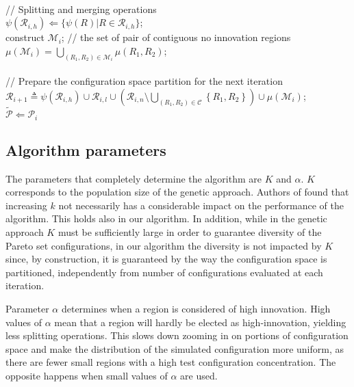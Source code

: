 \begin{algorithm}[t]
{			\nl \\ // Splitting and merging operations\\
			\nl $\psi(\mathscr{R}_{i,h}) \Leftarrow \lbrace 
					\psi(R) | R\in \mathscr{R}_{i,h}	
				\rbrace$; \\
			\nl construct $\mathscr{M}_i$; // the set of pair of contiguous no innovation regions \\
			\nl $\mu(\mathscr{M}_i) = \bigcup_{(R_1,R_2)\in\mathscr{M}_i} \mu(R_1,R_2)$;\\
			\nl\\ // Prepare the configuration space partition for the next iteration \\
			\nl $\mathcal{R}_{i+1} \triangleq
	\psi\left(\mathscr{R}_{i,h}\right) \cup \mathcal{R}_{i,l}\cup
	\left(\mathcal{R}_{i,n}\setminus\bigcup_{\left(R_{1},R_{2}\right)\in\mathcal{C}}\left\{ R_{1},R_{2}\right\} \right)\cup \mu(\mathscr{M}_i)$;\\
		}
	\nl $\tilde{\mathscr{P}} \Leftarrow \mathscr{P}_i$
\end{algorithm}
%

\subsection{Algorithm parameters}
The parameters that completely determine the algorithm are $K$ and $\alpha$.
$K$ corresponds to the population size of the genetic approach. Authors of \cite{zitzler_ec00} found that increasing $k$ not necessarily has a considerable impact on the performance of the algorithm. This holds also in our algorithm.  In addition, while in the genetic approach $K$ must be sufficiently large in order to guarantee diversity of the Pareto set configurations, in our algorithm the diversity is not impacted by $K$ since, by construction, it is guaranteed by the way the configuration space is partitioned, independently from number of configurations evaluated at each iteration. 

Parameter $\alpha$ determines when a region is considered of high innovation. High values of $\alpha$ mean that a region will hardly be elected as high-innovation, yielding less splitting operations. This slows down zooming in on portions of configuration space and make the distribution of the simulated configuration more uniform, as there are fewer small regions with a high test configuration concentration. The opposite happens when small values of $\alpha$ are used. 
